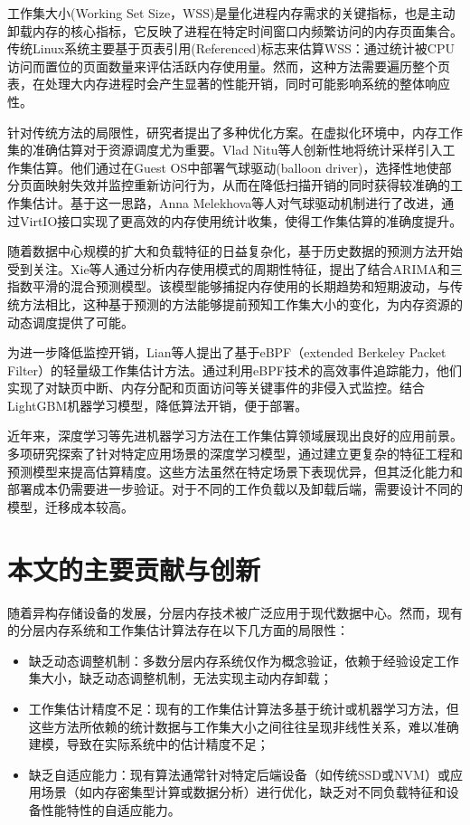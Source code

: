 工作集大小(Working Set Size，WSS)是量化进程内存需求的关键指标，也是主动卸载内存的核心指标，它反映了进程在特定时间窗口内频繁访问的内存页面集合。传统Linux系统主要基于页表引用(Referenced)标志来估算WSS：通过统计被CPU访问而置位的页面数量来评估活跃内存使用量。然而，这种方法需要遍历整个页表，在处理大内存进程时会产生显著的性能开销，同时可能影响系统的整体响应性。

针对传统方法的局限性，研究者提出了多种优化方案。在虚拟化环境中，内存工作集的准确估算对于资源调度尤为重要。Vlad Nitu等人创新性地将统计采样引入工作集估算。他们通过在Guest OS中部署气球驱动(balloon driver)，选择性地使部分页面映射失效并监控重新访问行为，从而在降低扫描开销的同时获得较准确的工作集估计。基于这一思路，Anna Melekhova等人对气球驱动机制进行了改进，通过VirtIO接口实现了更高效的内存使用统计收集，使得工作集估算的准确度提升。

随着数据中心规模的扩大和负载特征的日益复杂化，基于历史数据的预测方法开始受到关注。Xie等人通过分析内存使用模式的周期性特征，提出了结合ARIMA和三指数平滑的混合预测模型。该模型能够捕捉内存使用的长期趋势和短期波动，与传统方法相比，这种基于预测的方法能够提前预知工作集大小的变化，为内存资源的动态调度提供了可能。

为进一步降低监控开销，Lian等人提出了基于eBPF（extended Berkeley Packet Filter）的轻量级工作集估计方法。通过利用eBPF技术的高效事件追踪能力，他们实现了对缺页中断、内存分配和页面访问等关键事件的非侵入式监控。结合LightGBM机器学习模型，降低算法开销，便于部署。

近年来，深度学习等先进机器学习方法在工作集估算领域展现出良好的应用前景。多项研究探索了针对特定应用场景的深度学习模型，通过建立更复杂的特征工程和预测模型来提高估算精度。这些方法虽然在特定场景下表现优异，但其泛化能力和部署成本仍需要进一步验证。对于不同的工作负载以及卸载后端，需要设计不同的模型，迁移成本较高。


\section{本文的主要贡献与创新}

随着异构存储设备的发展，分层内存技术被广泛应用于现代数据中心。然而，现有的分层内存系统和工作集估计算法存在以下几方面的局限性：

\begin{itemize}
    \item 缺乏动态调整机制：多数分层内存系统仅作为概念验证，依赖于经验设定工作集大小，缺乏动态调整机制，无法实现主动内存卸载；
    
    \item 工作集估计精度不足：现有的工作集估计算法多基于统计或机器学习方法，但这些方法所依赖的统计数据与工作集大小之间往往呈现非线性关系，难以准确建模，导致在实际系统中的估计精度不足；
    
    \item 缺乏自适应能力：现有算法通常针对特定后端设备（如传统SSD或NVM）或应用场景（如内存密集型计算或数据分析）进行优化，缺乏对不同负载特征和设备性能特性的自适应能力。
\end{itemize}

